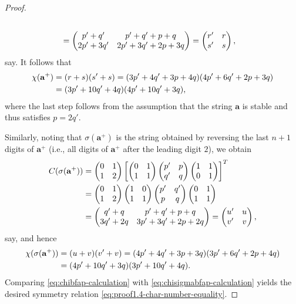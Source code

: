 \documentclass[10pt]{article}
\theoremstyle{definition}
\numberwithin{equation}{section}
\numberwithin{lemma}{section}
\newcommand{\bfa}{\mathbf{a}}
\newcommand{\bfap}{\bfa^+}
\newcommand{\mat}[1]{\begin{pmatrix} 0 & 1\\ 1 & #1\end{pmatrix}}
\begin{document}
\begin{proof}
\begin{align}
\\
\notag
&=\begin{pmatrix} 
p'+q' & p'+q'+p+q\\
2p'+3q' & 2p'+3q'+2p+ 3q
\end{pmatrix} 
= \begin{pmatrix} r'&r\\s'&s\end{pmatrix},
\end{align}
say.
It follows that 
\begin{align}
\label{eq:chibfap-calculation}
\chi(\bfap)&=(r+s)(s'+s)
=(3p'+4q'+3p+4q)(4p'+6q'+2p+3q)
\\
\notag
&=(3p'+10q'+4q)(4p'+10q'+3q),
\end{align}
where the last step follows from the assumption that the string $\bfa$ is
stable and thus satisfies $p=2q'$.

Similarly, noting that $\sigma(\bfap)$ is the string 
obtained by reversing the last $n+1$ digits of $\bfap$ (i.e., all digits 
of $\bfap$ after the leading digit $2$), we obtain 
\begin{align}
\notag
C(\sigma(\bfap))
&=\mat{2}\left[
\mat{1}
\begin{pmatrix} p'&p \\ q' & q\end{pmatrix}
\begin{pmatrix} 1&1 \\ 0 & 1\end{pmatrix}
\right]^T
\\
\notag
&=\mat{2}
\begin{pmatrix} 1&0\\1&1\end{pmatrix}
\begin{pmatrix} p'&q' \\ p & q\end{pmatrix}
\mat{1}
\\
\notag
&=\begin{pmatrix}
q'+q & p'+q'+p+q \\
3q' + 2q & 3p'+3q'+2p+2q
\end{pmatrix}
= \begin{pmatrix} u'&u\\v'&v\end{pmatrix},
\end{align}
say, and hence 
\begin{align}
\notag
\chi(\sigma(\bfap))
&=(u+v)(v'+v)=(4p'+4q'+3p+3q)(3p'+6q'+2p+4q)
\\
\label{eq:chisigmabfap-calculation}
&=(4p'+10q'+3q)(3p'+10q'+4q).
\end{align}
Comparing \eqref{eq:chibfap-calculation} 
with \eqref{eq:chisigmabfap-calculation} yields the desired symmetry
relation \eqref{eq:proof1.4-char-number-equality}.
\end{proof}
\end{document}

